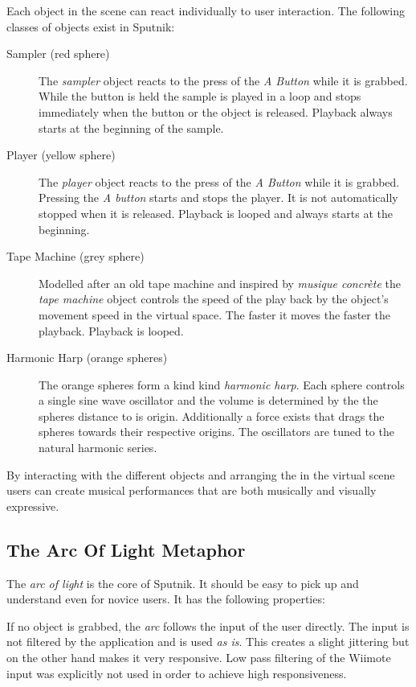 \documentclass[10pt,a4paper]{scrartcl}
\begin{document}
Each object in the scene can react individually to user interaction. The following classes of objects exist in Sputnik:
\begin{description}
\item[Sampler (red sphere)] The \emph{sampler} object reacts to the press of the \emph{A Button} while it is grabbed. While the button is held the sample is played in a loop and stops immediately when the button or the object is released. Playback always starts at the beginning of the sample.

\item[Player (yellow sphere)] The \emph{player} object reacts to the press of the \emph{A Button} while it is grabbed. Pressing the \emph{A button} starts and stops the player. It is not automatically stopped when it is released. Playback is looped and always starts at the beginning.

\item[Tape Machine (grey sphere)] Modelled after an old tape machine and inspired by \emph{musique concrète} the \emph{tape machine} object controls the speed of the play back by the object's movement speed in the virtual space. The faster it moves the faster the playback. Playback is looped.

\item[Harmonic Harp (orange spheres)] The orange spheres form a kind kind \emph{harmonic harp}. Each sphere controls a single sine wave oscillator and the volume is determined by the the spheres distance to is origin. Additionally a force exists that drags the spheres towards their respective origins. The oscillators are tuned to the natural harmonic series.
\end{description}

By interacting with the different objects and arranging the in the virtual scene users can create musical performances that are both musically and visually expressive.


\subsection{The Arc Of Light Metaphor}
The \emph{arc of light} is the core of Sputnik. It should be easy to pick up and understand even for novice users. It has the following properties:

If no object is grabbed, the \emph{arc} follows the input of the user directly. The input is not filtered by the application and is used \emph{as is}. This creates a slight jittering but on the other hand makes it very responsive. Low pass filtering of the Wiimote input was explicitly not used in order to achieve high responsiveness.
\end{document}
